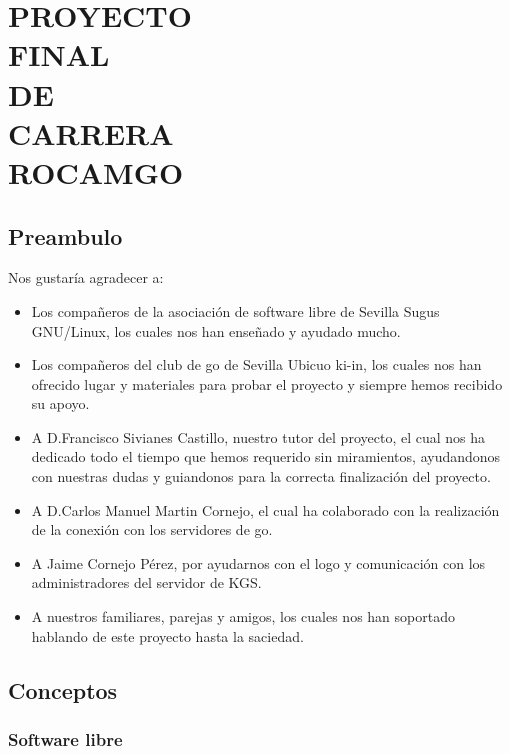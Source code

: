 \documentclass[12pt,a4paper]{report}
\author{David Medina Velasco \and Víctor Ramírez de la Corte}
\begin{document}
\part*{PROYECTO\\ FINAL\\ DE \\CARRERA \\ ROCAMGO\\}

\marginsize{3cm}{2cm}{2cm}{2cm} %
\tableofcontents  %

 
\chapter*{Preambulo} 

Nos gustaría agradecer a: 
\begin{itemize} 
    \item Los compañeros de la asociación de software libre de Sevilla Sugus 
    GNU/Linux, los cuales nos han enseñado y ayudado mucho.  
    \item Los compañeros del club de go de Sevilla Ubicuo ki-in, los cuales nos
    han ofrecido lugar y materiales para probar el proyecto y siempre hemos 
    recibido su apoyo.  
    \item A D.Francisco Sivianes Castillo, nuestro tutor del proyecto, el cual 
    nos ha dedicado todo el tiempo que hemos requerido sin miramientos, 
    ayudandonos con nuestras dudas y guiandonos para la correcta finalización 
    del proyecto.  
    \item A D.Carlos Manuel Martin Cornejo, el cual ha colaborado con la 
    realización de la conexión con los servidores de go.  
    \item A Jaime Cornejo Pérez, por ayudarnos con el logo y comunicación con 
    los administradores del servidor de KGS.  
    \item A nuestros familiares, parejas y amigos, los cuales nos han soportado 
    hablando de este proyecto hasta la saciedad.  
\end{itemize}


\chapter{Conceptos} 
\section{Software libre}
\end{document}
